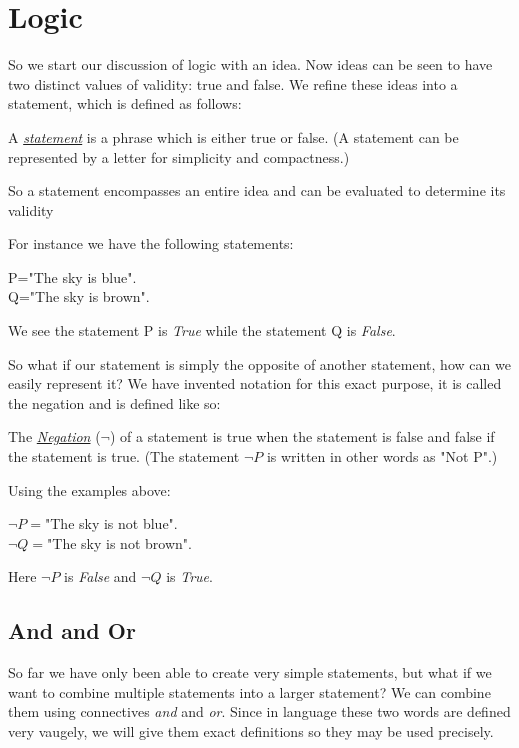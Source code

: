 \section{Logic}

So we start our discussion of logic with an idea.
Now ideas can be seen to have two distinct values of validity: true and false.
We refine these ideas into a statement, which is defined as follows:

\begin{defn}
	A \underline{\emph{statement}} is a phrase which is either true or false. (A statement can be represented by a letter for simplicity and compactness.)
\end{defn}

So a statement encompasses an entire idea and can be evaluated to determine its validity

\begin{ex}
    For instance we have the following statements:
	\begin{center}
    P="The sky is blue".\\
	Q="The sky is brown".
    \end{center}
    We see the statement P is \emph{True} while the statement Q is \emph{False}.
\end{ex}

So what if our statement is simply the opposite of another statement, how can we easily represent it?
We have invented notation for this exact purpose, it is called the negation and is defined like so:

\begin{defn}
	The \underline{\emph{Negation}} ($\neg$) of a statement is true when the statement is false and false if the statement is true.
	(The statement $\neg P$ is written in other words as "Not P".)
\end{defn}

\begin{ex}
    Using the examples above:
    \begin{center}
	$\neg P=$"The sky is not blue".\\
	$\neg Q=$"The sky is not brown".
    \end{center}
    Here $\neg P$ is \emph{False} and $\neg Q$ is \emph{True}.
\end{ex}

\subsection{And and Or}
So far we have only been able to create very simple statements, but what if we want to combine multiple statements into a larger statement?
We can combine them using connectives \emph{and} and \emph{or}.
Since in language these two words are defined very vaugely, we will give them exact definitions so they may be used precisely.

